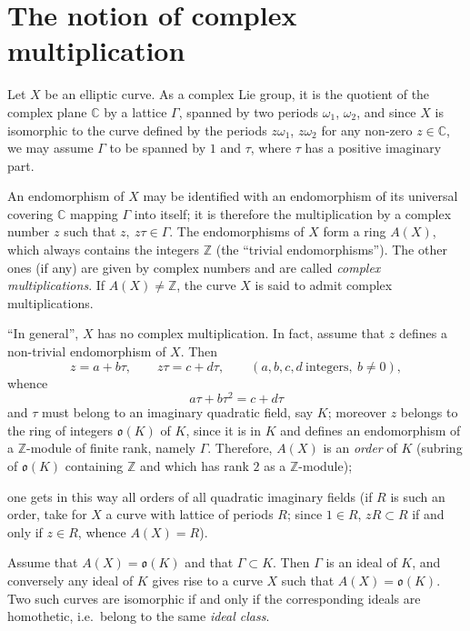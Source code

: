 
\section{The notion of complex multiplication}

Let $X$ be an elliptic curve. As a complex Lie group, it is the quotient
of the complex plane $\mathbb{C}$ by a lattice $\Gamma$, spanned by two
periods $\omega_{1}$, $\omega_{2}$, and since $X$ is isomorphic to the
curve defined by the periods $z\omega_{1}$, $z\omega_{2}$ for any non-zero
$z\in\mathbb{C}$, we may assume $\Gamma$ to be spanned by $1$ and $\tau$,
where $\tau$ has a positive imaginary part.

An endomorphism of $X$ may be identified with an endomorphism of its
universal covering $\mathbb{C}$ mapping $\Gamma$ into itself; it is
therefore the multiplication by a complex number $z$ such that
$z,\ z\tau\in\Gamma$. The endomorphisms of $X$ form a ring $A(X)$, which
always contains the integers $\mathbb{Z}$ (the ``trivial endomorphisms'').
The other ones (if any) are given by complex numbers and are called
\emph{complex multiplications}. If $A(X)\neq\mathbb{Z}$, the curve $X$ is
said to admit complex multiplications.

``In general'', $X$ has no complex multiplication. In fact, assume that
$z$ defines a non-trivial endomorphism of $X$. Then
\[
z=a+b\tau,\qquad z\tau=c+d\tau,\qquad(a,b,c,d\ \text{integers},\ b\neq 0),
\]
whence
\[
a\tau+b\tau^{2}=c+d\tau
\]
and $\tau$ must belong to an imaginary quadratic field, say $K$; moreover
$z$ belongs to the ring of integers $\mathfrak{o}(K)$ of $K$, since it is
in $K$ and defines an endomorphism of a $\mathbb{Z}$-module of finite
rank, namely $\Gamma$. Therefore, $A(X)$ is an \emph{order} of $K$
(subring of $\mathfrak{o}(K)$ containing $\mathbb{Z}$ and which has rank
$2$ as a $\mathbb{Z}$-module);

one gets in this way all orders of all quadratic imaginary fields (if $R$
is such an order, take for $X$ a curve with lattice of periods $R$; since
$1\in R$, $zR\subset R$ if and only if $z\in R$, whence $A(X)=R$).

Assume that $A(X)=\mathfrak{o}(K)$ and that $\Gamma\subset K$. Then
$\Gamma$ is an ideal of $K$, and conversely any ideal of $K$ gives rise
to a curve $X$ such that $A(X)=\mathfrak{o}(K)$. Two such curves are
isomorphic if and only if the corresponding ideals are homothetic,
i.e.\ belong to the same \emph{ideal class}.


